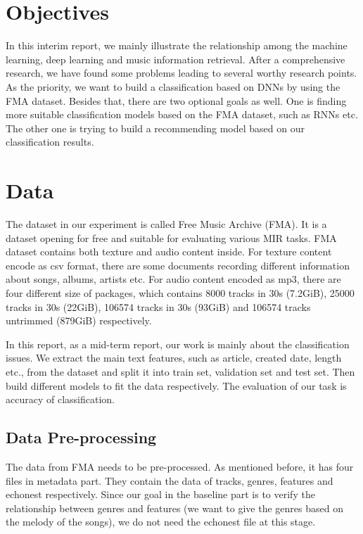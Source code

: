 \documentclass{article}
\begin{document}
\section{Objectives}
In this interim report, we mainly illustrate the relationship among the machine learning, deep learning and music information retrieval. After a comprehensive research, we have found some problems leading to several worthy research points. As the priority, we want to build a classification based on DNNs by using the FMA dataset. Besides that, there are two optional goals as well. One is finding more suitable classification models based on the FMA dataset, such as RNNs etc. The other one is trying to build a recommending model based on our classification results.


\section{Data}
The dataset in our experiment is called Free Music Archive (FMA). It is a dataset opening for free and suitable for evaluating various MIR tasks. FMA dataset contains both texture and audio content inside. For texture content encode as csv format, there are some documents recording different information about songs, albums, artists etc. For audio content encoded as mp3, there are four different size of packages, which contains 8000 tracks in 30s (7.2GiB), 25000 tracks in 30s (22GiB), 106574 tracks in 30s (93GiB) and 106574 tracks untrimmed (879GiB) respectively. 

In this report, as a mid-term report, our work is mainly about the classification issues. We extract the main text features, such as article, created date, length etc., from the dataset and split it into train set, validation set and test set. Then build different models to fit the data respectively. The evaluation of our task is accuracy of classification.

\subsection{Data Pre-processing}
The data from FMA needs to be pre-processed. As mentioned before, it has four files in metadata part. They contain the data of tracks, genres, features and echonest respectively. Since our goal in the baseline part is to verify the relationship between genres and features (we want to give the genres based on the melody of the songs), we do not need the echonest file at this stage.
\end{document}
